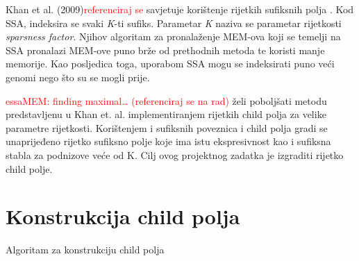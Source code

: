\documentclass[times, utf8, seminar, numeric]{fer}
\newcommand\todo[1]{\textcolor{red}{#1}}
\begin{document}
Khan et al. (2009)\todo{referenciraj se} savjetuje korištenje rijetkih sufiksnih polja . Kod SSA, indeksira se svaki \textit{K}-ti sufiks. Parametar \textit{K} naziva se parametar rijetkosti \textit{sparsness factor}. Njihov algoritam za pronalaženje MEM-ova koji se temelji na SSA pronalazi MEM-ove puno brže od prethodnih metoda te koristi manje memorije. Kao posljedica toga, uporabom SSA mogu se indeksirati puno veći genomi nego što su se mogli prije.

\todo{essaMEM: finding maximal… (referenciraj se na rad)} želi poboljšati metodu predstavljenu u Khan et. al. implementiranjem rijetkih child polja za velike parametre rijetkosti. Korištenjem i sufiksnih poveznica  i child polja gradi se unaprijeđeno rijetko sufiksno polje  koje ima istu ekspresivnost kao i sufiksna stabla za podnizove veće od K. Cilj ovog projektnog zadatka je izgraditi rijetko child polje.

\chapter{Konstrukcija child polja}

\begin{algorithm}[h]
	\caption{Algoritam za konstrukciju child polja}
	\label{alg:child-array}

	
	
	
\end{algorithm}
\end{document}
